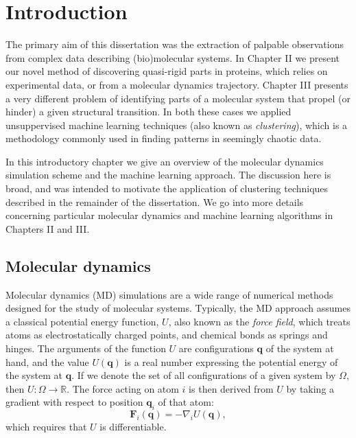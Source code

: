 

\chapter{Introduction}

The primary aim of this dissertation was the extraction of palpable observations from complex data describing (bio)molecular systems.
In Chapter II we present our novel method of discovering quasi-rigid parts in proteins, which relies on experimental data, or from a molecular dynamics trajectory.
Chapter III presents a very different problem of identifying parts of a molecular system that propel (or hinder) a given structural transition.
In both these cases we applied unsuppervised machine learning techniques (also known as \emph{clustering}), which is a methodology commonly used in finding patterns in seemingly chaotic data.

In this introductory chapter we give an overview of the molecular dynamics simulation scheme and the machine learning approach.
The discussion here is broad, and was intended to motivate the application of clustering techniques described in the remainder of the dissertation. %
We go into more details concerning particular molecular dynamics and machine learning algorithms in Chapters II and III. %


\section{Molecular dynamics}

Molecular dynamics (MD) simulations are a wide range of numerical methods designed for the study of molecular systems.
Typically, the MD approach assumes a classical potential energy function, $U$, also known as the \emph{force field}, which treats atoms as electrostatically charged points, and chemical bonds as springs and hinges.
The arguments of the function $U$ are configurations $\mathbf{q}$ of the system at hand, and the value $U(\mathbf{q})$ is a real number expressing the potential energy of the system at $\mathbf{q}$.
If we denote the set of all configurations of a given system by $\Omega$, then $U\colon\Omega\to\mathbb{R}$. %
The force acting on atom $i$ is then derived from $U$ by taking a gradient with respect to position $\mathbf{q}_i$ of that atom:
$$
\mathbf{F}_i(\mathbf{q}) = -\nabla_i U(\mathbf{q}),
$$
which requires that $U$ is differentiable. 


